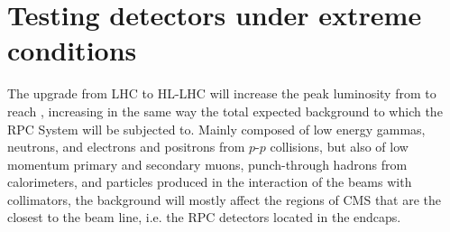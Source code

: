 \section{Testing detectors under extreme conditions}
\label{chapt5:sec:extreme}

	The upgrade from LHC to HL-LHC will increase the peak luminosity from  \siflux to reach  \siflux, increasing in the same way the total expected background to which the RPC System will be subjected to. Mainly composed of low energy gammas, neutrons, and electrons and positrons from $p$-$p$ collisions, but also of low momentum primary and secondary muons, punch-through hadrons from calorimeters, and particles produced in the interaction of the beams with collimators, the background will mostly affect the regions of CMS that are the closest to the beam line, i.e. the RPC detectors located in the endcaps.
    
